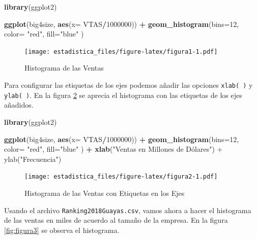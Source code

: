 \documentclass[]{book}
\newenvironment{Shaded}{\begin{snugshade}}{\end{snugshade}}
\newcommand{\KeywordTok}[1]{\textcolor[rgb]{0.13,0.29,0.53}{\textbf{#1}}}
\newcommand{\DataTypeTok}[1]{\textcolor[rgb]{0.13,0.29,0.53}{#1}}
\newcommand{\DecValTok}[1]{\textcolor[rgb]{0.00,0.00,0.81}{#1}}
\newcommand{\StringTok}[1]{\textcolor[rgb]{0.31,0.60,0.02}{#1}}
\newcommand{\OperatorTok}[1]{\textcolor[rgb]{0.81,0.36,0.00}{\textbf{#1}}}
\newcommand{\NormalTok}[1]{#1}
\begin{document}
\begin{Shaded}
\begin{Highlighting}[]
\KeywordTok{library}\NormalTok{(ggplot2)}

\KeywordTok{ggplot}\NormalTok{(big4size, }\KeywordTok{aes}\NormalTok{(}\DataTypeTok{x=}\NormalTok{ VTAS}\OperatorTok{/}\DecValTok{1000000}\NormalTok{)) }\OperatorTok{+}\StringTok{ }
\StringTok{  }\KeywordTok{geom_histogram}\NormalTok{(}\DataTypeTok{bins=}\DecValTok{12}\NormalTok{, }\DataTypeTok{color=} \StringTok{"red"}\NormalTok{, }\DataTypeTok{fill=}\StringTok{"blue"}\NormalTok{ )}
\end{Highlighting}
\end{Shaded}

\begin{figure}
\centering
\texttt{[image: estadistica\_files/figure-latex/figura1-1.pdf]}
\caption{\label{fig:figura1}Histograma de las Ventas}
\end{figure}

Para configurar las etiquetas de los ejes podemos añadir las opciones
\texttt{xlab(\ )} y \texttt{ylab(\ )}. En la figura \ref{fig:figura2} se
aprecia el histograma con las etiquetas de los ejes añadidos.

\begin{Shaded}
\begin{Highlighting}[]
\KeywordTok{library}\NormalTok{(ggplot2)}

\KeywordTok{ggplot}\NormalTok{(big4size, }\KeywordTok{aes}\NormalTok{(}\DataTypeTok{x=}\NormalTok{ VTAS}\OperatorTok{/}\DecValTok{1000000}\NormalTok{)) }\OperatorTok{+}\StringTok{ }
\StringTok{  }\KeywordTok{geom_histogram}\NormalTok{(}\DataTypeTok{bins=}\DecValTok{12}\NormalTok{, }\DataTypeTok{color=} \StringTok{"red"}\NormalTok{,  }\DataTypeTok{fill=}\StringTok{"blue"}\NormalTok{ ) }\OperatorTok{+}\StringTok{ }
\StringTok{  }\KeywordTok{xlab}\NormalTok{(}\StringTok{"Ventas en Millones de Dólares") + ylab("}\NormalTok{Frecuencia}\StringTok{")}
\end{Highlighting}
\end{Shaded}

\begin{figure}
\centering
\texttt{[image: estadistica\_files/figure-latex/figura2-1.pdf]}
\caption{\label{fig:figura2}Histograma de las Ventas con Etiquetas en los
Ejes}
\end{figure}

Usando el archivo \texttt{Ranking2018Guayas.csv}, vamos ahora a hacer el
histograma de las ventas en miles de acuerdo al tamaño de la empresa. En
la figura \ref{fig:figura3} se observa el histograma.
\end{document}
